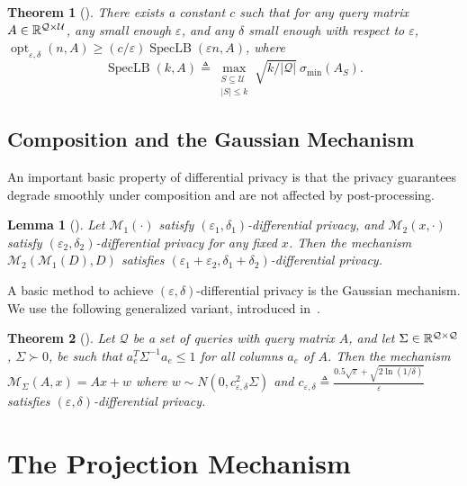 \documentclass{article}
\newtheorem{theorem}{Theorem}[section]
\newtheorem{lemma}{Lemma}[theorem]
\newcommand{\mech}{\mathcal{M}}
\newcommand{\eps}{\varepsilon}
\newcommand{\univ}{U}
\DeclareMathOperator{\specLB}{SpecLB}
\DeclareMathOperator{\opt}{opt}
\renewcommand{\univ}{\mathcal{U}}
\newcommand{\quer}{\mathcal{Q}}
\begin{document}
\begin{theorem}[\cite{NTZ}]\label{thm:speclb-small}
  There exists a constant $c$ such that for any query matrix $A \in
  \R^{\quer \times \univ}$, any small enough $\eps$, and any $\delta$
  small enough with respect to $\eps$, $\opt_{\eps, \delta}(n, A) \geq
  (c/\eps) \specLB(\eps n, A)$, where
  \begin{equation*}
    \specLB(k, A) \triangleq \max_{\substack{S \subseteq \univ\\|S| \leq
        k}} {\sqrt{{k}/{|\quer|}}\ \sigma_{\min}(A_S)}.
  \end{equation*}

\end{theorem}

\subsection{Composition and the Gaussian Mechanism}

An important basic property of differential privacy is that the
privacy guarantees degrade smoothly under composition and are not
affected by post-processing.

\begin{lemma}[\cite{DMNS,odo}]
  \label{lm:simple-composition}
  Let $\mech_1(\cdot)$ satisfy $(\eps_1, \delta_1)$-differential privacy, and
  $\mech_2(x,\cdot) $ satisfy $(\eps_2, \delta_2)$-differential
  privacy for any fixed $x$. Then the mechanism
  $\mech_2(\mech_1(D), D)$ satisfies
  $(\eps_1 + \eps_2, \delta_1 + \delta_2)$-differential privacy.
\end{lemma}

A basic method to achieve $(\eps, \delta)$-differential privacy is the
Gaussian mechanism. We  use the following generalized variant,
introduced in~\cite{NTZ}.

\begin{theorem}[\cite{DN,DworkN04,DMNS,NTZ}]\label{thm:gaussian}
  Let $\quer$ be a set of queries with query matrix $A$, and let
  $\Sigma \in \R^{\quer \times \quer}$, $\Sigma\succ 0$, be such that
  $a_e^T\Sigma^{-1}a_e \leq 1$ for all columns $a_e$ of $A$. Then the
  mechanism $\mech_\Sigma(A, x) = Ax + w$ where $w \sim N(0,c_{\eps,
    \delta}^2\Sigma)$ and $c_{\eps, \delta}\triangleq \frac{0.5\sqrt{\eps} +
    \sqrt{2\ln(1/\delta)}}{\eps}$ satisfies $(\eps,
  \delta)$-differential privacy.
\end{theorem}

\section{The Projection Mechanism}
\end{document}
